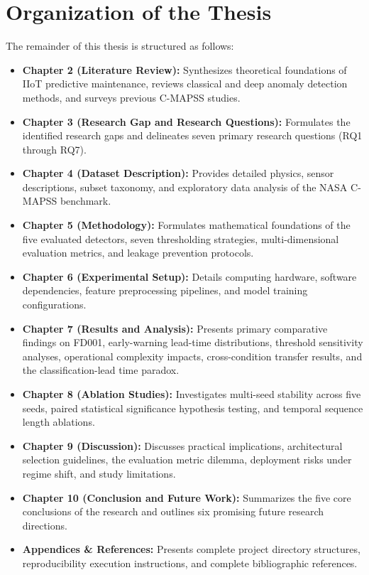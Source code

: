 \documentclass[12pt,a4paper,oneside]{report}
\begin{document}
\section{Organization of the Thesis}
The remainder of this thesis is structured as follows:
\begin{itemize}
    \item \textbf{Chapter 2 (Literature Review):} Synthesizes theoretical foundations of IIoT predictive maintenance, reviews classical and deep anomaly detection methods, and surveys previous C-MAPSS studies.
    \item \textbf{Chapter 3 (Research Gap and Research Questions):} Formulates the identified research gaps and delineates seven primary research questions (RQ1 through RQ7).
    \item \textbf{Chapter 4 (Dataset Description):} Provides detailed physics, sensor descriptions, subset taxonomy, and exploratory data analysis of the NASA C-MAPSS benchmark.
    \item \textbf{Chapter 5 (Methodology):} Formulates mathematical foundations of the five evaluated detectors, seven thresholding strategies, multi-dimensional evaluation metrics, and leakage prevention protocols.
    \item \textbf{Chapter 6 (Experimental Setup):} Details computing hardware, software dependencies, feature preprocessing pipelines, and model training configurations.
    \item \textbf{Chapter 7 (Results and Analysis):} Presents primary comparative findings on FD001, early-warning lead-time distributions, threshold sensitivity analyses, operational complexity impacts, cross-condition transfer results, and the classification-lead time paradox.
    \item \textbf{Chapter 8 (Ablation Studies):} Investigates multi-seed stability across five seeds, paired statistical significance hypothesis testing, and temporal sequence length ablations.
    \item \textbf{Chapter 9 (Discussion):} Discusses practical implications, architectural selection guidelines, the evaluation metric dilemma, deployment risks under regime shift, and study limitations.
    \item \textbf{Chapter 10 (Conclusion and Future Work):} Summarizes the five core conclusions of the research and outlines six promising future research directions.
    \item \textbf{Appendices \& References:} Presents complete project directory structures, reproducibility execution instructions, and complete bibliographic references.
\end{itemize}
\end{document}
